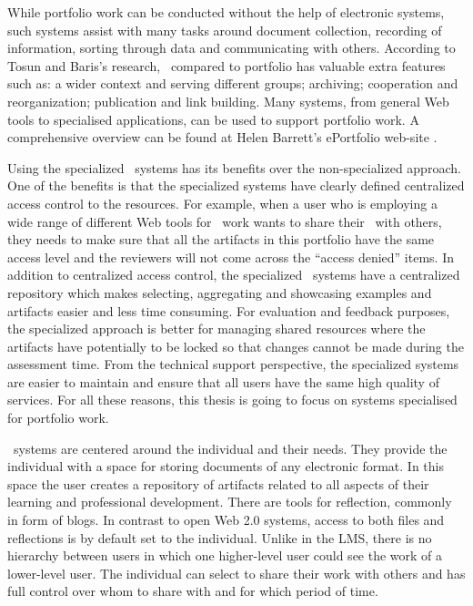 While portfolio work can be conducted without the help of electronic systems,
such systems assist with many tasks around document collection, recording of
information, sorting through data and communicating with others. According to
Tosun and Baris's \citeyearpar{Tosun2011} research, \ep~compared to portfolio
has valuable extra features such as: a wider context and serving different
groups; archiving; cooperation and reorganization; publication and link building.
Many systems, from general Web tools to specialised applications, can be used to
support portfolio work. A comprehensive overview can be found at Helen Barrett's
ePortfolio web-site \citep{Barrett2008}. 

Using the specialized \ep~systems has its benefits over the non-specialized
approach. One of the benefits is that the specialized systems have clearly
defined centralized access control to the resources. For example, when a user
who is employing a wide range of different Web tools for \ep~work wants to share
their \ep~with others, they needs to make sure that all the artifacts in this
portfolio have the same access level and the reviewers will not come across the
``access denied'' items. In addition to centralized access control, the
specialized \ep~systems have a centralized repository which makes selecting,
aggregating and showcasing examples and artifacts easier and less time
consuming. For evaluation and feedback purposes, the specialized approach is
better for managing shared resources where the artifacts have potentially to be
locked so that changes cannot be made during the assessment time. From the
technical support perspective, the specialized systems are easier to maintain
and ensure that all users have the same high quality of services. For all these
reasons, this thesis is going to focus on systems specialised for portfolio
work.

\ep~systems are centered around the individual and their needs. They provide the
individual with a space for storing documents of any electronic format. In this
space the user creates a repository of artifacts related to all aspects of their
learning and professional development. There are tools for reflection, commonly
in form of blogs. In contrast to open Web 2.0 systems, access to both files and
reflections is by default set to the individual. Unlike in the LMS, there is no
hierarchy between users in which one higher-level user could see the work of a
lower-level user. The individual can select to share their work with others and
has full control over whom to share with and for which period of time. 

